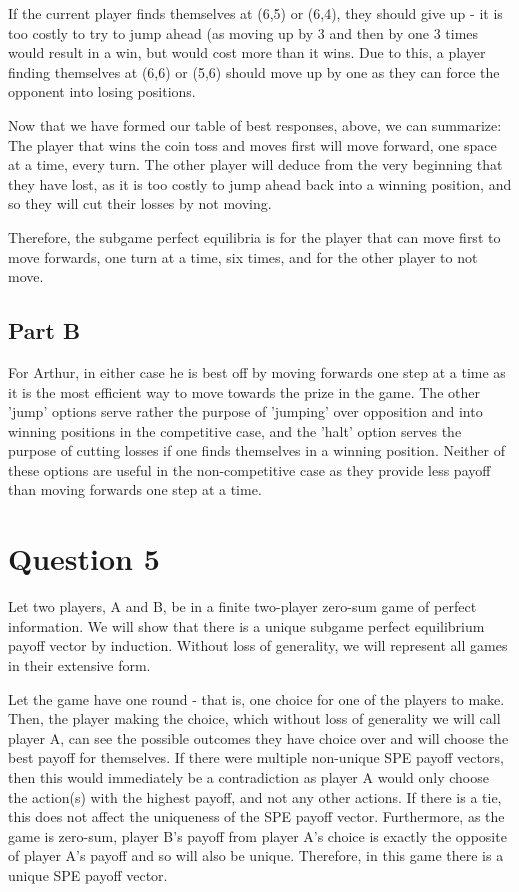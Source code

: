 \documentclass[11pt]{article} %
\begin{document}
If the current player finds themselves at (6,5) or (6,4), they should give up - it is too costly to try to jump ahead (as moving up by 3 and then by one 3 times would result in a win, but would cost more than it wins. Due to this, a player finding themselves at (6,6) or (5,6) should move up by one as they can force the opponent into losing positions.

Now that we have formed our table of best responses, above, we can summarize: The player that wins the coin toss and moves first will move forward, one space at a time, every turn. The other player will deduce from the very beginning that they have lost, as it is too costly to jump ahead back into a winning position, and so they will cut their losses by not moving.

Therefore, the subgame perfect equilibria is for the player that can move first to move forwards, one turn at a time, six times, and for the other player to not move.
\subsection{Part B}
For Arthur, in either case he is best off by moving forwards one step at a time as it is the most efficient way to move towards the prize in the game. The other 'jump' options serve rather the purpose of 'jumping' over opposition and into winning positions in the competitive case, and the 'halt' option serves the purpose of cutting losses if one finds themselves in a winning position. Neither of these options are useful in the non-competitive case as they provide less payoff than moving forwards one step at a time.
\section{Question 5} %
Let two players, A and B, be in a finite two-player zero-sum game of perfect information. We will show that there is a unique subgame perfect equilibrium payoff vector by induction. Without loss of generality, we will represent all games in their extensive form.

Let the game have one round - that is, one choice for one of the players to make. Then, the player making the choice, which without loss of generality we will call player A, can see the possible outcomes they have choice over and will choose the best payoff for themselves. If there were multiple non-unique SPE payoff vectors, then this would immediately be a contradiction as player A would only choose the action(s) with the highest payoff, and not any other actions. If there is a tie, this does not affect the uniqueness of the SPE payoff vector. Furthermore, as the game is zero-sum, player B's payoff from player A's choice is exactly the opposite of player A's payoff and so will also be unique. Therefore, in this game there is a unique SPE payoff vector.
\end{document}
